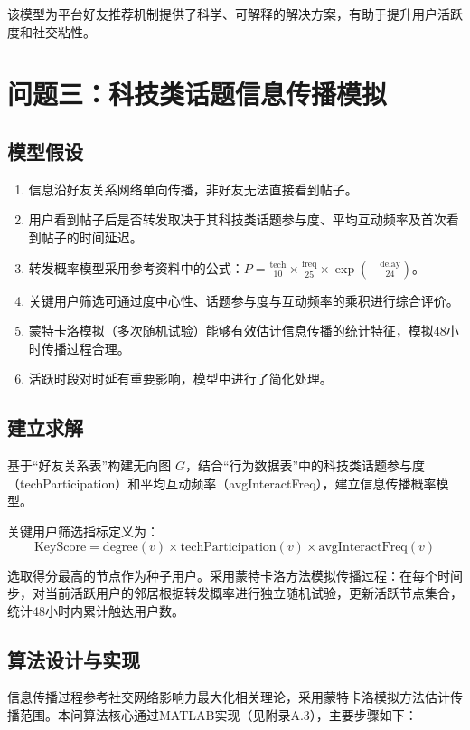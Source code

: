 \documentclass[a4paper,12pt]{ctexart}
\begin{document}
该模型为平台好友推荐机制提供了科学、可解释的解决方案，有助于提升用户活跃度和社交粘性。


\section{问题三：科技类话题信息传播模拟}
\subsection{模型假设}
\begin{enumerate}
    \item 信息沿好友关系网络单向传播，非好友无法直接看到帖子。
    \item 用户看到帖子后是否转发取决于其科技类话题参与度、平均互动频率及首次看到帖子的时间延迟。
    \item 转发概率模型采用参考资料中的公式：$P = \frac{\text{tech}}{10} \times \frac{\text{freq}}{25} \times \exp(-\frac{\text{delay}}{24})$。
    \item 关键用户筛选可通过度中心性、话题参与度与互动频率的乘积进行综合评价。
    \item 蒙特卡洛模拟（多次随机试验）能够有效估计信息传播的统计特征，模拟48小时传播过程合理。
    \item 活跃时段对时延有重要影响，模型中进行了简化处理。
\end{enumerate}

\subsection{建立求解}
基于“好友关系表”构建无向图 $G$，结合“行为数据表”中的科技类话题参与度（techParticipation）和平均互动频率（avgInteractFreq），建立信息传播概率模型。

关键用户筛选指标定义为：
\[
\text{KeyScore} = \text{degree}(v) \times \text{techParticipation}(v) \times \text{avgInteractFreq}(v)
\]

选取得分最高的节点作为种子用户。采用蒙特卡洛方法模拟传播过程：在每个时间步，对当前活跃用户的邻居根据转发概率进行独立随机试验，更新活跃节点集合，统计48小时内累计触达用户数。

\subsection{算法设计与实现}
信息传播过程参考社交网络影响力最大化相关理论\cite{ref4}，采用蒙特卡洛模拟方法估计传播范围。本问算法核心通过MATLAB实现（见附录A.3），主要步骤如下：
\end{document}
